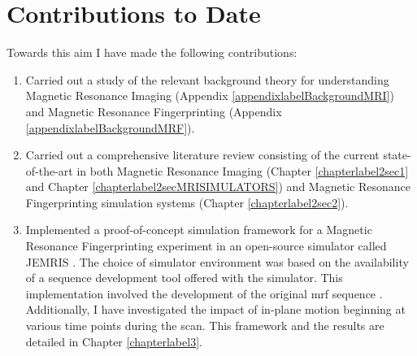 \section{Contributions to Date}\label{chapterlabel4sec1}

Towards this aim I have made the following contributions:

\begin{enumerate}

	\item Carried out a study of the relevant background theory for understanding Magnetic Resonance Imaging (Appendix \ref{appendixlabelBackgroundMRI}) and Magnetic Resonance Fingerprinting (Appendix \ref{appendixlabelBackgroundMRF}).
	
	\item Carried out a comprehensive literature review consisting of the current state-of-the-art in both Magnetic Resonance Imaging (Chapter \ref{chapterlabel2sec1} and Chapter \ref{chapterlabel2secMRISIMULATORS}) and Magnetic Resonance Fingerprinting simulation systems (Chapter \ref{chapterlabel2sec2}).
	
	\item Implemented a proof-of-concept simulation framework for a Magnetic Resonance Fingerprinting experiment in an open-source simulator called JEMRIS \cite{Stocker2010}.
	The choice of simulator environment was based on the availability of a sequence development tool offered with the simulator.
	This implementation involved the development of the original \ac{mrf} sequence \cite{Ma2013}.
	Additionally, I have investigated the impact of in-plane motion beginning at various time points during the scan.
	This framework and the results are detailed in Chapter \ref{chapterlabel3}.
	
\end{enumerate}